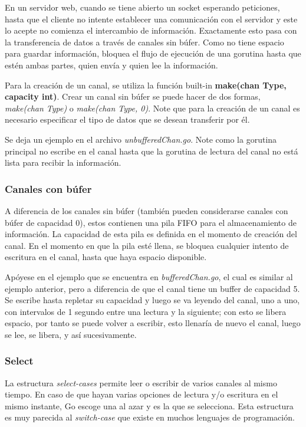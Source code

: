 \documentclass[10pt]{article} %
\begin{document}
En un servidor web, cuando se tiene abierto un socket esperando peticiones, hasta que el cliente no intente establecer una comunicación con el servidor y este lo acepte no comienza el intercambio de información. Exactamente esto pasa con la transferencia de datos a través de canales sin búfer. Como no tiene espacio para guardar información, bloquea el flujo de ejecución de una gorutina hasta que estén ambas partes, quien envía y quien lee la información.

Para la creación de un canal, se utiliza la función built-in \textbf{make(chan Type, capacity int)}. Crear un canal sin búfer se puede hacer de dos formas, \textit{make(chan Type)} o \textit{make(chan Type, 0)}. Note que para la creación de un canal es necesario especificar el tipo de datos que se desean transferir por él.

Se deja un ejemplo en el archivo \textit{unbufferedChan.go}. Note como la gorutina principal no escribe en el canal hasta que la gorutina de lectura del canal no está lista para recibir la información. 

\subsubsection{Canales con búfer}

A diferencia de los canales sin búfer (también pueden considerarse canales con búfer de capacidad 0), estos contienen una pila FIFO para el almacenamiento de información. La capacidad de esta pila es definida en el momento de creación del canal. En el momento en que la pila esté llena, se bloquea cualquier intento de escritura en el canal, hasta que haya espacio disponible.

Apóyese en el ejemplo que se encuentra en \textit{bufferedChan.go}, el cual es similar al ejemplo anterior, pero a diferencia de que el canal tiene un buffer de capacidad 5. Se escribe hasta repletar su capacidad y luego se va leyendo del canal, uno a uno, con intervalos de 1 segundo entre una lectura y la siguiente; con esto se libera espacio, por tanto se puede volver a escribir, esto llenaría de nuevo el canal, luego se lee, se libera, y así sucesivamente. 

\subsubsection{Select}

La estructura \emph{select-cases} permite leer o escribir de varios canales al mismo tiempo. En caso de que hayan varias opciones de lectura y/o escritura en el mismo instante, Go escoge una al azar y es la que se selecciona. Esta estructura es muy parecida al \textit{switch-case} que existe en muchos lenguajes de programación.
\end{document}
